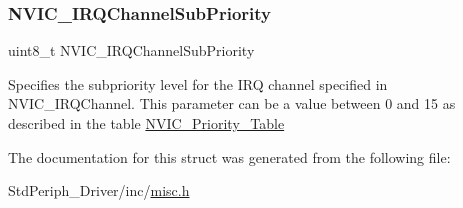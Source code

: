 \subsubsection{\texorpdfstring{NVIC\_IRQChannelSubPriority}{NVIC\_IRQChannelSubPriority}}
{\footnotesize\ttfamily uint8\+\_\+t N\+V\+I\+C\+\_\+\+I\+R\+Q\+Channel\+Sub\+Priority}

Specifies the subpriority level for the I\+RQ channel specified in N\+V\+I\+C\+\_\+\+I\+R\+Q\+Channel. This parameter can be a value between 0 and 15 as described in the table \mbox{\hyperlink{group___n_v_i_c___priority___table}{N\+V\+I\+C\+\_\+\+Priority\+\_\+\+Table}} 

The documentation for this struct was generated from the following file\+:\begin{DoxyCompactItemize}
\item 
Std\+Periph\+\_\+\+Driver/inc/\mbox{\hyperlink{misc_8h}{misc.\+h}}\end{DoxyCompactItemize}
